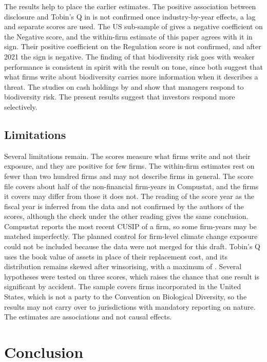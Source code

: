 \documentclass[12pt,a4paper]{article}
\begin{document}
The results help to place the earlier estimates. The positive association between disclosure and Tobin's Q in \citet{he2024} is not confirmed once industry-by-year effects, a lag and separate scores are used. The US sub-sample of \citet{cosma2025} gives a negative coefficient on the Negative score, and the within-firm estimate of this paper agrees with it in sign. Their positive coefficient on the Regulation score is not confirmed, and after 2021 the sign is negative. The finding of \citet{bach2025} that biodiversity risk goes with weaker performance is consistent in spirit with the result on tone, since both suggest that what firms write about biodiversity carries more information when it describes a threat. The studies on cash holdings by \citet{ahmad2024} and \citet{wang2026} show that managers respond to biodiversity risk. The present results suggest that investors respond more selectively.

\subsection{Limitations}

Several limitations remain. The scores measure what firms write and not their exposure, and they are positive for few firms. The within-firm estimates rest on fewer than two hundred firms and may not describe firms in general. The score file covers about half of the non-financial firm-years in Compustat, and the firms it covers may differ from those it does not. The reading of the score year as the fiscal year is inferred from the data and not confirmed by the authors of the scores, although the check under the other reading gives the same conclusion. Compustat reports the most recent CUSIP of a firm, so some firm-years may be matched imperfectly. The planned control for firm-level climate change exposure \citep{sautner2023} could not be included because the data were not merged for this draft. Tobin's Q uses the book value of assets in place of their replacement cost, and its distribution remains skewed after winsorising, with a maximum of \maxQ{}. Several hypotheses were tested on three scores, which raises the chance that one result is significant by accident. The sample covers firms incorporated in the United States, which is not a party to the Convention on Biological Diversity, so the results may not carry over to jurisdictions with mandatory reporting on nature. The estimates are associations and not causal effects.

\section{Conclusion}
\end{document}

